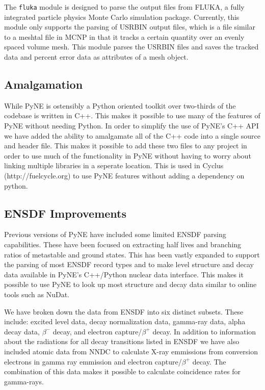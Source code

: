 \documentclass{anstrans}
\begin{document}
The \texttt{fluka} module is designed to parse the output files from FLUKA, a fully 
integrated particle physics Monte Carlo simulation package. Currently, 
this module only supports the parsing of USRBIN output files, which is 
a file similar to a meshtal file in MCNP in that it tracks a certain 
quantity over an evenly spaced volume mesh. This module parses the USRBIN 
files and saves the tracked data and percent error data as attributes of 
a mesh object.

\subsection{Amalgamation}

While PyNE is ostensibly a Python oriented toolkit over two-thirds 
of the codebase is written in C++. This makes it possible to use many 
of the features of PyNE without needing Python. In order to simplify 
the use of PyNE's C++ API we have added the ability to amalgamate all 
of the C++ code into a single source and header file. This makes it 
possible to add these two files to any project in order to use much of the 
functionality in PyNE without having to worry about linking multiple 
libraries in a seperate location. This is used in Cyclus (http://fuelcycle.org)
 to use PyNE features without adding a dependency on python.

\subsection{ENSDF Improvements}

Previous versions of PyNE have included some limited ENSDF parsing capabilities. 
These have been focused on extracting half lives and branching ratios of 
metastable and ground states. This has been vastly expanded to support the 
parsing of most ENSDF record types and to make level structure and decay data 
available in PyNE's C++/Python nuclear data interface. This makes it possible 
to use PyNE to look up most structure and decay data similar to online tools
such as NuDat. 

We have broken down the data from ENSDF into six distinct subsets. These 
include: excited level data, decay normalization data, gamma-ray data, alpha 
decay data, $\beta^-$ decay, and electron capture/$\beta^+$ decay. In addition 
to information about the radiations for all decay transitions listed in ENSDF we 
have also included atomic data from NNDC to calculate X-ray emmissions from 
conversion electrons in gamma ray emmission and electron capture/$\beta^+$ decay.
The combination of this data makes it possible to calculate coincidence rates for
gamma-rays.
\end{document}
